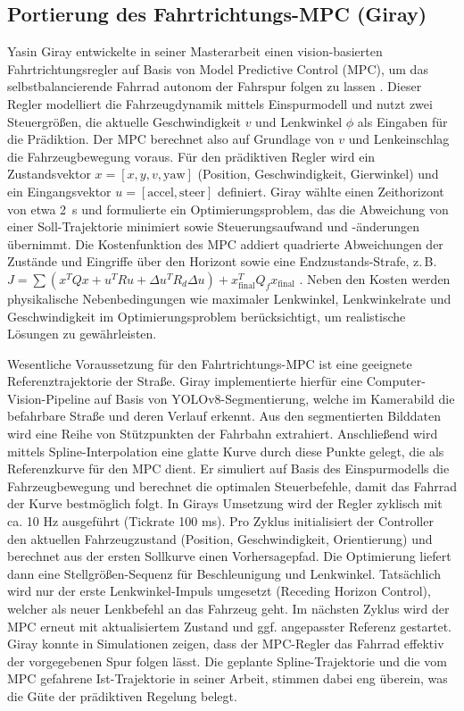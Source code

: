 \subsection{Portierung des Fahrtrichtungs-MPC (Giray)} \label{chap:MPC_KAPITEL}
Yasin Giray entwickelte in seiner Masterarbeit einen vision-basierten 
Fahrtrichtungsregler auf Basis von Model Predictive Control (MPC), 
um das selbstbalancierende Fahrrad autonom der Fahrspur folgen zu lassen \citep{vision_mpc_readme}. Dieser Regler modelliert die Fahrzeugdynamik mittels Einspurmodell 
und nutzt zwei Steuergrößen, die aktuelle Geschwindigkeit \(v\) und Lenkwinkel \(\phi\) als Eingaben für die Prädiktion. Der MPC berechnet 
also auf Grundlage von \(v\) und Lenkeinschlag die Fahrzeugbewegung voraus. Für den prädiktiven Regler wird ein 
Zustandsvektor \(x=[x, y, v, \text{yaw}]\) (Position, Geschwindigkeit, Gierwinkel) und ein Eingangsvektor \(u=[\text{accel}, \text{steer}]\) 
definiert. Giray wählte einen Zeithorizont von etwa 2~s und formulierte ein Optimierungsproblem, das die Abweichung von einer Soll-Trajektorie 
minimiert sowie Steuerungsaufwand und -änderungen übernimmt. Die Kostenfunktion des MPC addiert quadrierte Abweichungen der Zustände und Eingriffe über den Horizont sowie eine 
Endzustands-Strafe, z.\,B. \(J=\sum (x^T Q x + u^T R u + \Delta u^T R_d \Delta u) + x_{\text{final}}^T Q_f x_{\text{final}}\) \citep{vision_mpc_readme}. 
Neben den Kosten werden physikalische Nebenbedingungen wie maximaler Lenkwinkel, Lenkwinkelrate und Geschwindigkeit im Optimierungsproblem 
berücksichtigt, um realistische Lösungen zu gewährleisten.

Wesentliche Voraussetzung für den Fahrtrichtungs-MPC ist eine geeignete Referenztrajektorie der Straße. Giray implementierte hierfür eine 
Computer-Vision-Pipeline auf Basis von YOLOv8-Segmentierung, welche im Kamerabild die befahrbare Straße und deren Verlauf erkennt. Aus den 
segmentierten Bilddaten wird eine Reihe von Stützpunkten der Fahrbahn extrahiert. Anschließend 
wird mittels Spline-Interpolation eine glatte Kurve durch diese Punkte gelegt, die als Referenzkurve für den MPC dient. Er simuliert auf Basis des Einspurmodells die Fahrzeugbewegung und berechnet die optimalen 
Steuerbefehle, damit das Fahrrad der Kurve bestmöglich folgt. In Girays Umsetzung wird der Regler zyklisch mit ca. 10 Hz ausgeführt (Tickrate 100 ms). 
Pro Zyklus initialisiert der Controller den aktuellen Fahrzeugzustand (Position, Geschwindigkeit, Orientierung) und berechnet aus der ersten Sollkurve 
einen Vorhersagepfad. Die Optimierung liefert dann eine Stellgrößen-Sequenz für Beschleunigung und Lenkwinkel. 
Tatsächlich wird nur der erste Lenkwinkel-Impuls umgesetzt (Receding Horizon Control), welcher als neuer Lenkbefehl an das Fahrzeug geht. 
Im nächsten Zyklus wird der MPC erneut mit aktualisiertem Zustand und ggf. angepasster Referenz gestartet. Giray konnte in Simulationen zeigen, 
dass der MPC-Regler das Fahrrad effektiv der vorgegebenen Spur folgen lässt. Die geplante Spline-Trajektorie und die vom MPC gefahrene 
Ist-Trajektorie in seiner Arbeit, stimmen dabei eng überein, was die Güte der prädiktiven Regelung belegt.


